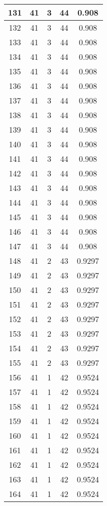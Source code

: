\documentclass[letterpaper, 12pt]{article}
\begin{document}
\begin{longtable}{|c|c|c|c|c|}
\hline
131 & 41 & 3 & 44 & 0.908 \\
\hline
132 & 41 & 3 & 44 & 0.908 \\
\hline
133 & 41 & 3 & 44 & 0.908 \\
\hline
134 & 41 & 3 & 44 & 0.908 \\
\hline
135 & 41 & 3 & 44 & 0.908 \\
\hline
136 & 41 & 3 & 44 & 0.908 \\
\hline
137 & 41 & 3 & 44 & 0.908 \\
\hline
138 & 41 & 3 & 44 & 0.908 \\
\hline
139 & 41 & 3 & 44 & 0.908 \\
\hline
140 & 41 & 3 & 44 & 0.908 \\
\hline
141 & 41 & 3 & 44 & 0.908 \\
\hline
142 & 41 & 3 & 44 & 0.908 \\
\hline
143 & 41 & 3 & 44 & 0.908 \\
\hline
144 & 41 & 3 & 44 & 0.908 \\
\hline
145 & 41 & 3 & 44 & 0.908 \\
\hline
146 & 41 & 3 & 44 & 0.908 \\
\hline
147 & 41 & 3 & 44 & 0.908 \\
\hline
148 & 41 & 2 & 43 & 0.9297 \\
\hline
149 & 41 & 2 & 43 & 0.9297 \\
\hline
150 & 41 & 2 & 43 & 0.9297 \\
\hline
151 & 41 & 2 & 43 & 0.9297 \\
\hline
152 & 41 & 2 & 43 & 0.9297 \\
\hline
153 & 41 & 2 & 43 & 0.9297 \\
\hline
154 & 41 & 2 & 43 & 0.9297 \\
\hline
155 & 41 & 2 & 43 & 0.9297 \\
\hline
156 & 41 & 1 & 42 & 0.9524 \\
\hline
157 & 41 & 1 & 42 & 0.9524 \\
\hline
158 & 41 & 1 & 42 & 0.9524 \\
\hline
159 & 41 & 1 & 42 & 0.9524 \\
\hline
160 & 41 & 1 & 42 & 0.9524 \\
\hline
161 & 41 & 1 & 42 & 0.9524 \\
\hline
162 & 41 & 1 & 42 & 0.9524 \\
\hline
163 & 41 & 1 & 42 & 0.9524 \\
\hline
164 & 41 & 1 & 42 & 0.9524 \\

\end{longtable}
\end{document}
